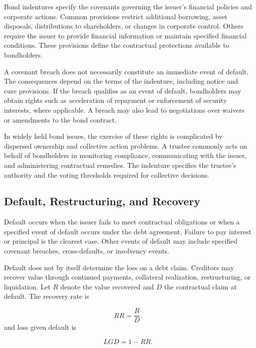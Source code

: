 Bond indentures specify the covenants governing the
issuer's financial policies and corporate actions.
Common provisions restrict additional borrowing,
asset disposals, distributions to shareholders, or
changes in corporate control. Others require the
issuer to provide financial information or maintain
specified financial conditions. These provisions
define the contractual protections available to
bondholders.

A covenant breach does not necessarily constitute
an immediate event of default. The consequences depend
on the terms of the indenture, including notice and
cure provisions. If the breach qualifies as an event
of default, bondholders may obtain rights such as
acceleration of repayment or enforcement of security
interests, where applicable. A breach may also lead
to negotiations over waivers or amendments to the
bond contract.

In widely held bond issues, the exercise of these
rights is complicated by dispersed ownership and
collective action problems. A trustee commonly acts
on behalf of bondholders in monitoring compliance,
communicating with the issuer, and administering
contractual remedies. The indenture specifies the
trustee's authority and the voting thresholds required
for collective decisions.

\subsection{Default, Restructuring, and Recovery}

Default occurs when the issuer fails to meet contractual obligations or when a specified event of default occurs under the debt agreement. Failure to pay interest or principal is the clearest case. Other events of default may include specified covenant breaches, cross-defaults, or insolvency events.

Default does not by itself determine the loss on a debt claim. Creditors may recover value through continued payments, collateral realization, restructuring, or liquidation. Let $R$ denote the value recovered and $D$ the contractual claim at default. The recovery rate is

\begin{equation}
RR=\frac{R}{D}.
\label{eq:ch8-recovery-rate}
\end{equation}
and loss given default is

\begin{equation}
LGD=1-RR.
\label{eq:ch8-lgd}
\end{equation}

